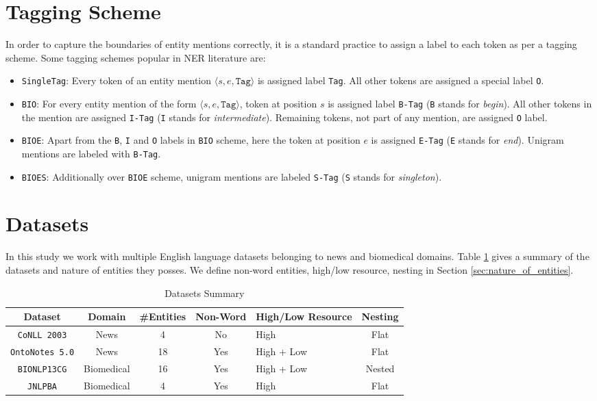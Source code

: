 \section{Tagging Scheme}
\label{sec:tagging_scheme}
In order to capture the boundaries of entity mentions correctly, it is a standard practice to assign a label to each token as per a tagging scheme. Some tagging schemes popular in NER literature are:

\begin{itemize}
    \item \texttt{SingleTag}: Every token of an entity mention $\langle s, e, \texttt{Tag} \rangle$ is assigned label \texttt{Tag}. All other tokens are assigned a special label \texttt{O}.
    
    \item \texttt{BIO}: For every entity mention of the form $\langle s, e, \texttt{Tag} \rangle$, token at position $s$ is assigned label \texttt{B-Tag} (\texttt{B} stands for \textit{begin}). All other tokens in the mention are assigned \texttt{I-Tag} (\texttt{I} stands for \textit{intermediate}). Remaining tokens, not part of any mention, are assigned \texttt{O} label. 
    
    \item \texttt{BIOE}: Apart from the \texttt{B}, \texttt{I} and \texttt{O} labels in \texttt{BIO} scheme, here the token at position $e$ is assigned \texttt{E-Tag} (\texttt{E} stands for \textit{end}). Unigram mentions are labeled with \texttt{B-Tag}.
    
    \item \texttt{BIOES}: Additionally over \texttt{BIOE} scheme, unigram mentions are labeled \texttt{S-Tag} (\texttt{S} stands for \textit{singleton}).
\end{itemize}

\section{Datasets}
\label{sec:datasets}
In this study we work with multiple English language datasets belonging to news and biomedical domains. Table \ref{tab:datasets_summary} gives a summary of the datasets and nature of entities they posses. We define non-word entities, high/low resource, nesting in Section \ref{sec:nature_of_entities}.

\begin{table}[h!]
	\begin{tabular}{|c|c|c|c|p{6em}|c|}\hline
	\textbf{Dataset} & \textbf{Domain} & \textbf{\#Entities} & \textbf{Non-Word} & \textbf{High/Low Resource} & \textbf{Nesting}\\\hline
	\texttt{CoNLL 2003} & News & 4 & No & High & Flat\\\hline
	\texttt{OntoNotes 5.0} & News & 18 & Yes & High + Low & Flat\\\hline
	\texttt{BIONLP13CG} & Biomedical & 16 & Yes & High + Low & Nested\\\hline
	\texttt{JNLPBA} & Biomedical & 4 & Yes & High & Flat\\\hline
	\end{tabular}
	\caption{Datasets Summary}
	\label{tab:datasets_summary}
\end{table}

